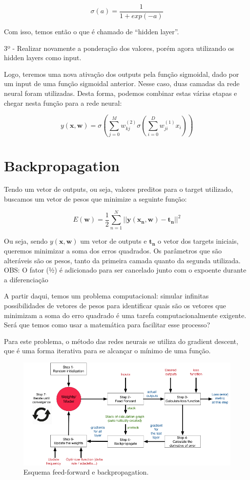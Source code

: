 \documentclass[]{book}
\theoremstyle{definition}
\theoremstyle{definition}
\theoremstyle{definition}
\theoremstyle{remark}
\begin{document}
\[
  \sigma(a) = \frac{1}{1 + exp(-a)}
\]

Com isso, temos então o que é chamado de ``hidden layer''.

3º - Realizar novamente a ponderação dos valores, porém agora utilizando os hidden layers como input.

Logo, teremos uma nova ativação dos outputs pela função sigmoidal, dado por um input de uma função sigmoidal anterior. Nesse caso, duas camadas da rede neural foram utilizadas. Desta forma, podemos combinar estas várias etapas e chegar nesta função para a rede neural:

\[
y(\mathbf{x, w})= \sigma(\sum_{j=0}^M w_{kj}^{(2)} \sigma(\sum_{i=0}^D w_{ji}^{(1)}x_i))
\]

\hypertarget{backpropagation}{%
\section{Backpropagation}\label{backpropagation}}

Tendo um vetor de outputs, ou seja, valores preditos para o target utilizado, buscamos um vetor de pesos que minimize a seguinte função:

\[
E(\mathbf{w})= \frac{1}{2} \sum_{n=1}^N ||\mathbf{y(x_n, w) - t_n}||^2
\]

Ou seja, sendo \(y(\mathbf{x, w})\) um vetor de outputs e \(\mathbf{t_n}\) o vetor dos targets iniciais, queremos minimizar a soma dos erros quadrados. Os parâmetros que são alteráveis são os pesos, tanto da primeira camada quanto da segunda utilizada. OBS: O fator (½) é adicionado para ser cancelado junto com o expoente durante a diferenciação

A partir daqui, temos um problema computacional: simular infinitas possibilidades de vetores de pesos para identificar quais são os vetores que minimizam a soma do erro quadrado é uma tarefa computacionalmente exigente. Será que temos como usar a matemática para facilitar esse processo?

Para este problema, o método das redes neurais se utiliza do gradient descent, que é uma forma iterativa para se alcançar o mínimo de uma função.

\begin{figure}

{\centering \includegraphics{./images/backpropagation} 

}

\caption{Esquema feed-forward e backpropagation.}\label{fig:backpropagation}
\end{figure}
\end{document}
